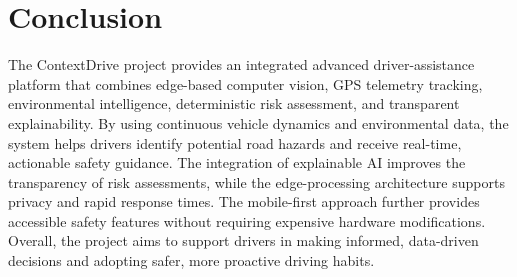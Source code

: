 \chapter{Conclusion}

The ContextDrive project provides an integrated advanced driver-assistance platform that combines edge-based computer vision, GPS telemetry tracking, environmental intelligence, deterministic risk assessment, and transparent explainability. By using continuous vehicle dynamics and environmental data, the system helps drivers identify potential road hazards and receive real-time, actionable safety guidance. The integration of explainable AI improves the transparency of risk assessments, while the edge-processing architecture supports privacy and rapid response times. The mobile-first approach further provides accessible safety features without requiring expensive hardware modifications. Overall, the project aims to support drivers in making informed, data-driven decisions and adopting safer, more proactive driving habits.